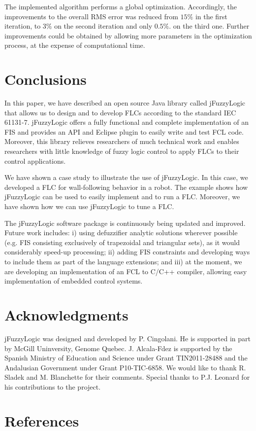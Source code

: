 \documentclass[11pt,twoside]{article}
\begin{document}
\begin{multicols}{2}
The implemented algorithm performs a global optimization. Accordingly, the improvements to the overall RMS error was reduced from $15\%$ in the first iteration, to $3\%$ on the second iteration and only $0.5\%$. on the third one. Further improvements could be obtained by allowing more parameters in the optimization process, at the expense of computational time.


\section{Conclusions}
\label{sec:con}

In this paper, we have described an open source Java library called jFuzzyLogic that allows us to design and to develop FLCs according to the standard IEC 61131-7. jFuzzyLogic offers a fully functional and complete implementation of an FIS and provides an API and Eclipse plugin to easily write and test FCL code. Moreover,  this library relieves researchers of much technical work and enables researchers with little knowledge of fuzzy logic control to apply FLCs to their control applications.

We have shown a case study to illustrate the use of jFuzzyLogic. In this case, we developed a FLC for wall-following behavior in a robot. The example shows how jFuzzyLogic can be used to easily implement and to run a FLC. Moreover, we have shown how we can use jFuzzyLogic to tune a FLC.

The jFuzzyLogic software package is continuously being updated and improved. 
Future work includes: 
	i) using defuzzifier analytic solutions wherever possible (e.g. FIS consisting exclusively of trapezoidal and triangular sets), as it would considerably speed-up processing; 
	ii) adding FIS constraints and developing ways to include them as part of the language extensions; and
	iii) at the moment, we are developing an implementation of an FCL to C/C++ compiler, allowing easy implementation of embedded control systems.


\section*{Acknowledgments}

jFuzzyLogic was designed and developed by P. Cingolani. He is supported in part by McGill Uninversity, Genome Quebec. J. Alcala-Fdez is supported by the Spanish Ministry of Education and Science under Grant TIN2011-28488 and the Andalusian Government under Grant P10-TIC-6858. We would like to thank R. Sladek and M. Blanchette for their comments. Special thanks to P.J. Leonard for his contributions to the project.


\section*{References}


\end{multicols}
\end{document}
